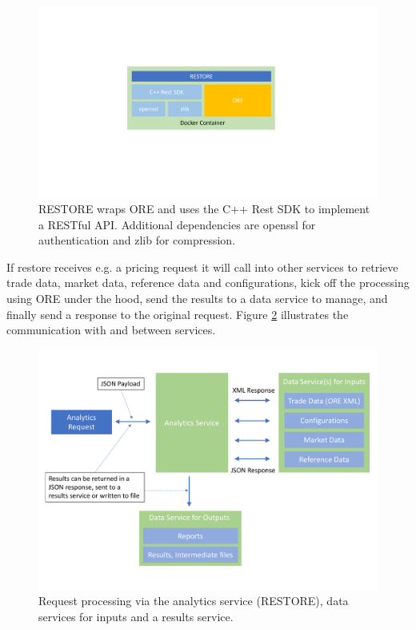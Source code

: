 \documentclass[12pt, a4paper]{report}
\begin{document}
\begin{figure}[h]
\begin{center}
\includegraphics[scale=0.6]{data/restore.pdf}
\end{center}
\caption{RESTORE wraps ORE and uses the C++ Rest SDK to implement a RESTful API. Additional dependencies
  are openssl for authentication and zlib for compression.}
\label{fig:restore}
\end{figure}

If restore receives e.g. a pricing request it will call into other services to retrieve trade data,
market data, reference data and configurations, kick off the processing using ORE under
the hood, send the results to a data service to manage, and finally send a response to the original request. 
Figure \ref{fig:services} illustrates the communication with and between services.

\begin{figure}[h]
\begin{center}
\includegraphics[scale=0.4]{data/services.pdf}
\end{center}
\caption{Request processing via the analytics service (RESTORE), data services for inputs and a
  results service.}
\label{fig:services}
\end{figure}
\end{document}
